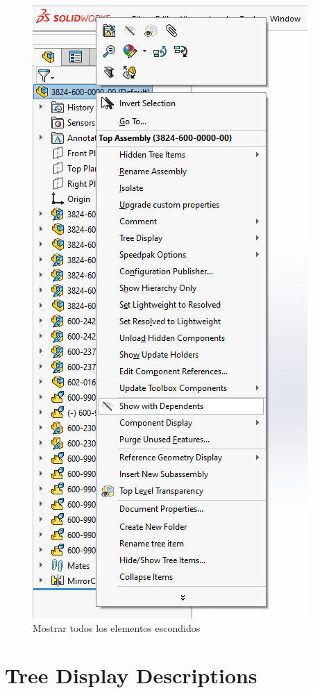 \documentclass[12pt,letterpaper,final]{report}
\begin{document}
\begin{figure}[H]
	\centering
	\includegraphics[width=0.85\linewidth, height=0.75\textheight,keepaspectratio]{Imagenes/solidworks_quickhide_03}
	\caption{Mostrar todos los elementos escondidos}
	\label{fig:solidworksquickhide03}
\end{figure}


\chapter{Tree Display Descriptions}
\end{document}
